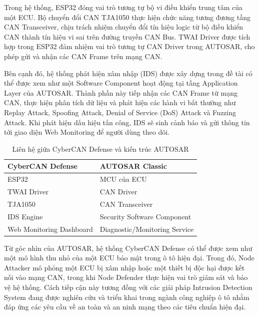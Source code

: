 Trong hệ thống, ESP32 đóng vai trò tương tự bộ vi điều khiển trung tâm của một ECU. Bộ chuyển đổi CAN TJA1050 thực hiện chức năng tương đương tầng CAN Transceiver, chịu trách nhiệm chuyển đổi tín hiệu logic từ bộ điều khiển CAN thành tín hiệu vi sai trên đường truyền CAN Bus. TWAI Driver được tích hợp trong ESP32 đảm nhiệm vai trò tương tự CAN Driver trong AUTOSAR, cho phép gửi và nhận các CAN Frame trên mạng CAN.

Bên cạnh đó, hệ thống phát hiện xâm nhập (IDS) được xây dựng trong đề tài có thể được xem như một Software Component hoạt động tại tầng Application Layer của AUTOSAR. Thành phần này tiếp nhận các CAN Frame từ mạng CAN, thực hiện phân tích dữ liệu và phát hiện các hành vi bất thường như Replay Attack, Spoofing Attack, Denial of Service (DoS) Attack và Fuzzing Attack. Khi phát hiện dấu hiệu tấn công, IDS sẽ sinh cảnh báo và gửi thông tin tới giao diện Web Monitoring để người dùng theo dõi.


\begin{table}[H]
	\centering
	\caption{Liên hệ giữa CyberCAN Defense và kiến trúc AUTOSAR}
	\label{tab:autosar_mapping}
	
	\begin{tabular}{|p{6cm}|p{6cm}|}
		\hline
		\textbf{CyberCAN Defense} &
		\textbf{AUTOSAR Classic} \\
		\hline
		
		ESP32 &
		MCU của ECU \\
		\hline
		
		TWAI Driver &
		CAN Driver \\
		\hline
		
		TJA1050 &
		CAN Transceiver \\
		\hline
			
		IDS Engine &
		Security Software Component \\
		\hline
		
		Web Monitoring Dashboard &
		Diagnostic/Monitoring Service \\
		\hline
		
	\end{tabular}
\end{table}

Từ góc nhìn của AUTOSAR, hệ thống CyberCAN Defense có thể được xem như một mô hình thu nhỏ của một ECU bảo mật trong ô tô hiện đại. Trong đó, Node Attacker mô phỏng một ECU bị xâm nhập hoặc một thiết bị độc hại được kết nối vào mạng CAN, trong khi Node Defender thực hiện vai trò giám sát và bảo vệ hệ thống. Cách tiếp cận này tương đồng với các giải pháp Intrusion Detection System đang được nghiên cứu và triển khai trong ngành công nghiệp ô tô nhằm đáp ứng các yêu cầu về an toàn và an ninh mạng theo các tiêu chuẩn hiện đại.

